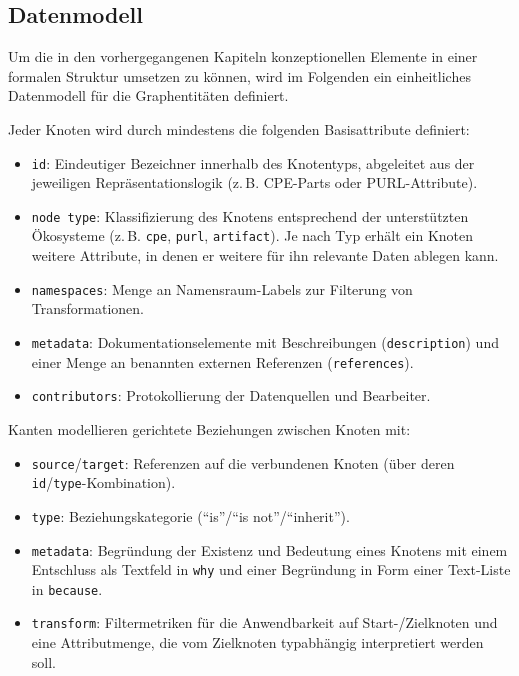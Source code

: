 \subsection{Datenmodell}

Um die in den vorhergegangenen Kapiteln konzeptionellen Elemente in einer formalen Struktur umsetzen zu können, wird im Folgenden ein einheitliches Datenmodell für die Graphentitäten definiert.

Jeder Knoten wird durch mindestens die folgenden Basisattribute definiert:

\begin{itemize}
    \itemsep0em
    \item \texttt{id}: Eindeutiger Bezeichner innerhalb des Knotentyps, abgeleitet aus der jeweiligen Repräsentationslogik (z.\,B. CPE-Parts oder PURL-Attribute).
    \item \texttt{node type}: Klassifizierung des Knotens entsprechend der unterstützten Ökosysteme (z.\,B. \texttt{cpe}, \texttt{purl}, \texttt{artifact}).
    Je nach Typ erhält ein Knoten weitere Attribute, in denen er weitere für ihn relevante Daten ablegen kann.
    \item \texttt{namespaces}: Menge an Namensraum-Labels zur Filterung von Transformationen.
    \item \texttt{metadata}: Dokumentationselemente mit Beschreibungen (\texttt{description}) und einer Menge an benannten externen Referenzen (\texttt{references}).
    \item \texttt{contributors}: Protokollierung der Datenquellen und Bearbeiter.
\end{itemize}

Kanten modellieren gerichtete Beziehungen zwischen Knoten mit:

\begin{itemize}
    \itemsep0em
    \item \texttt{source}/\texttt{target}: Referenzen auf die verbundenen Knoten (über deren \texttt{id}/\texttt{type}-Kombination).
    \item \texttt{type}: Beziehungskategorie (\enquote{is}/\enquote{is not}/\enquote{inherit}).
    \item \texttt{metadata}: Begründung der Existenz und Bedeutung eines Knotens mit einem Entschluss als Textfeld in \texttt{why} und einer Begründung in Form einer Text-Liste in \texttt{because}.
    \item \texttt{transform}: Filtermetriken für die Anwendbarkeit auf Start-/Zielknoten und eine Attributmenge, die vom Zielknoten typabhängig interpretiert werden soll.
\end{itemize}

